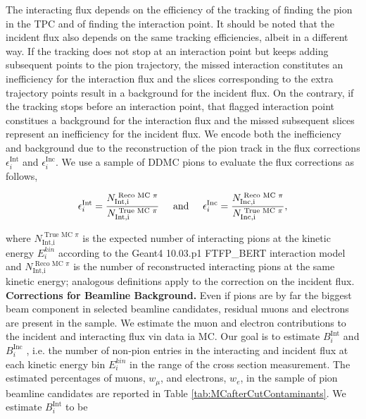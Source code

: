\documentclass[aps,prl,twocolumn,showpacs,superscriptaddress,groupedaddress]{revtex4}  %
\begin{document}
The interacting flux depends on the efficiency of the tracking of finding the pion in the TPC and of finding the interaction point. It should be noted that the incident flux also depends on the same tracking efficiencies, albeit in a different way. If the tracking does not stop at an interaction point but keeps adding subsequent points to the pion trajectory, the missed interaction constitutes an inefficiency for the interaction flux and the slices corresponding to the extra trajectory points result in a background for the incident flux. On the contrary, if the tracking stops before an interaction point,  that flagged interaction point constitues a background for the interaction flux and the missed subsequent slices represent an inefficiency for the incident flux. We encode both the inefficiency and background due to the reconstruction of the pion track in the flux corrections $\epsilon^{\text{Int}}_i$ and $\epsilon^{\text{Inc}}_i$. We use a sample of DDMC pions to evaluate the flux corrections as follows,

\begin{equation}
 \epsilon^{\text{Int}}_i  =  \frac{N^{\text{ Reco MC $\pi$}}_{\text{Int,i}}}{ N^{\text{ True MC  $\pi$}}_{\text{Int,i}}  } \hspace{0.5cm}\text{and}\hspace{0.5cm}  \epsilon^{\text{Inc}}_i  =  \frac{N^{\text{ Reco MC $\pi$}}_{\text{Inc,i}}}{ N^{\text{ True MC  $\pi$}}_{\text{Inc,i}}  },
\end{equation}

where $N^{\text{ True MC  $\pi$}}_{\text{Int,i}}$ is the expected number of interacting pions at the kinetic energy $E^{kin}_i$ according to the Geant4 10.03.p1 FTFP\_BERT interaction model and  $N^{\text{ Reco MC $\pi$}}_{\text{Int,i}}$ is the number of reconstructed interacting pions at the same kinetic energy; analogous definitions apply to the correction on the incident flux. \\




\textbf{Corrections for Beamline Background.}
Even if pions are by far the biggest beam component in selected beamline candidates, residual muons and electrons are present in the sample. We estimate the muon and electron contributions to the incident and interacting flux vin data ia MC. Our goal is to estimate  $B^{ \text{Int}}_i$ and  $B^{ \text{Inc}}_i$ , i.e. the number of non-pion entries in the interacting and incident flux at each kinetic energy bin $E^{kin}_i$ in the range of the cross section measurement. The estimated percentages of muons, $w_\mu$,  and electrons, $w_e$,  in the sample of pion beamline candidates are reported in Table \ref{tab:MCafterCutContaminants}. We estimate 
$B^{ \text{Int}}_i$ to be
\end{document}
